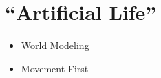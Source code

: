 \documentclass[12pt]{paper}
\begin{document}
\section{``Artificial Life''}
\begin{itemize}
 \item World Modeling
\item Movement First
\end{itemize}






  
  
\end{document}
